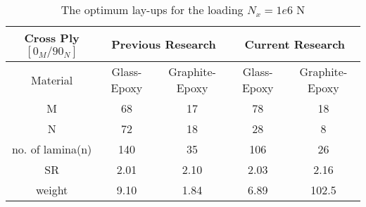 \begin{table}[!htb]
\caption{The optimum lay-ups for the loading $N_x=1e6$ N}
\centering
\begin{adjustbox}{width=1\textwidth}
\begin{tabular}{c|cc|cc}
	\toprule
	Cross Ply $[0_M/90_N]$         & \multicolumn{2}{c}{Previous Research} & \multicolumn{2}{c}{Current Research} \\
	\midrule																								  
	 Material       &  Glass-Epoxy & Graphite-Epoxy  & Glass-Epoxy & Graphite-Epoxy      \\ 
	      M         &  68          &    17           &  78		    &  18             \\
	      N         &  72          &    18           &  28		    &  8              \\
no. of lamina(n)    &  140         &    35           &  106	    &  26                     \\
         SR         &  2.01        &    2.10         &  2.03	    &  2.16            \\
     weight         &  9.10        &    1.84         &  6.89	    &  102.5           \\
	\bottomrule
\end{tabular}
\end{adjustbox}
\label{tab:comparsion}
\end{table}
